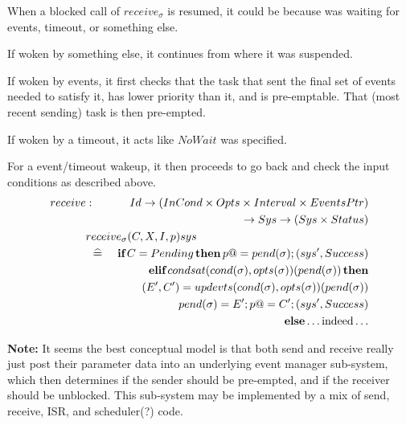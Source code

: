 When a blocked call of $receive_\sigma$ is resumed,
it could be because was waiting for events, timeout,
or something else.

If woken by something else, it continues from where it was suspended.

If woken by events,
it first checks that the task that sent the final set of events
needed to satisfy it,
has lower priority than it, and is pre-emptable.
That (most recent sending) task is then pre-empted.

If woken by a timeout, it acts like $NoWait$ was specified.

For a event/timeout wakeup,
it then proceeds to go back and check the input conditions
as described above.
\begin{eqnarray*}
   receive &:& Id \fun (InCond \times Opts \times Interval \times EventsPtr)
\\ && {} \fun Sys \fun (Sys \times Status)
\\ \lefteqn{receive_\sigma(C,X,I,p)sys}
\\ &\defs& \IF C=Pending \THEN p @= pend(\sigma) ; (sys',Success)
\\    && \ELIF condsat(cond(\sigma),opts(\sigma))(pend(\sigma)) \THEN
\\    && \quad (E',C') = updevts(cond(\sigma),opts(\sigma))(pend(\sigma))
\\    && \quad pend(\sigma) = E' ; p@=C'; (sys',Success)
\\    && \ELSE \dots\mbox{indeed}\dots
\end{eqnarray*}

\textbf{Note:}
\textsf{It seems the best conceptual model is that both send and receive
really just post their parameter data into an underlying
event manager sub-system, which then determines if the sender
should be pre-empted, and if the receiver should be unblocked.
This sub-system may be implemented by a mix of send, receive, ISR,
and scheduler(?) code.}
